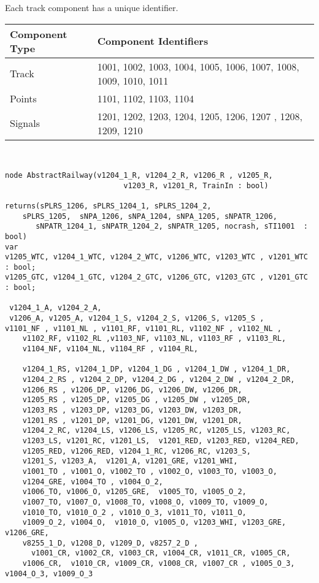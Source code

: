 Each track component has a unique identifier.

\begin{center}
    \begin{tabular}{ | l |  p{5cm} |}
    \hline
    Component Type & Component Identifiers \\ \hline
    Track &   1001, 1002, 1003, 1004, 1005, 1006, 1007, 1008, 1009, 1010, 1011 \\ \hline
    Points &  1101, 1102, 1103, 1104  \\ \hline
    Signals & 1201, 1202, 1203, 1204, 1205, 1206, 1207 , 1208, 1209, 1210 \\
    \hline
    \end{tabular}
\end{center}



\begin{verbatim}


node AbstractRailway(v1204_1_R, v1204_2_R, v1206_R , v1205_R,
                           v1203_R, v1201_R, TrainIn : bool)

returns(sPLRS_1206, sPLRS_1204_1, sPLRS_1204_2,
	sPLRS_1205,  sNPA_1206, sNPA_1204, sNPA_1205, sNPATR_1206,
       sNPATR_1204_1, sNPATR_1204_2, sNPATR_1205, nocrash, sTI1001  : bool)
var 
v1205_WTC, v1204_1_WTC, v1204_2_WTC, v1206_WTC, v1203_WTC , v1201_WTC : bool;
v1205_GTC, v1204_1_GTC, v1204_2_GTC, v1206_GTC, v1203_GTC , v1201_GTC : bool;
	
 v1204_1_A, v1204_2_A,
 v1206_A, v1205_A, v1204_1_S, v1204_2_S, v1206_S, v1205_S ,
v1101_NF , v1101_NL , v1101_RF, v1101_RL, v1102_NF , v1102_NL ,
    v1102_RF, v1102_RL ,v1103_NF, v1103_NL, v1103_RF , v1103_RL,
	v1104_NF, v1104_NL, v1104_RF , v1104_RL,
	
	v1204_1_RS, v1204_1_DP, v1204_1_DG , v1204_1_DW , v1204_1_DR, 
	v1204_2_RS , v1204_2_DP, v1204_2_DG , v1204_2_DW , v1204_2_DR, 
	v1206_RS , v1206_DP, v1206_DG, v1206_DW, v1206_DR,
	v1205_RS , v1205_DP, v1205_DG , v1205_DW , v1205_DR,
	v1203_RS , v1203_DP, v1203_DG, v1203_DW, v1203_DR,
	v1201_RS , v1201_DP, v1201_DG, v1201_DW, v1201_DR,
	v1204_2_RC, v1204_LS, v1206_LS, v1205_RC, v1205_LS, v1203_RC, 
	v1203_LS, v1201_RC, v1201_LS,  v1201_RED, v1203_RED, v1204_RED,
	v1205_RED, v1206_RED, v1204_1_RC, v1206_RC, v1203_S,
    v1201_S, v1203_A,  v1201_A, v1201_GRE, v1201_WHI,
	v1001_TO , v1001_O, v1002_TO , v1002_O, v1003_TO, v1003_O,
	v1204_GRE, v1004_TO , v1004_O_2,
	v1006_TO, v1006_O, v1205_GRE,  v1005_TO, v1005_O_2,
	v1007_TO, v1007_O, v1008_TO, v1008_O, v1009_TO, v1009_O,
	v1010_TO, v1010_O_2 , v1010_O_3, v1011_TO, v1011_O,
	v1009_O_2, v1004_O,  v1010_O, v1005_O, v1203_WHI, v1203_GRE, v1206_GRE,
	v8255_1_D, v1208_D, v1209_D, v8257_2_D ,
      v1001_CR, v1002_CR, v1003_CR, v1004_CR, v1011_CR, v1005_CR,
	v1006_CR,  v1010_CR, v1009_CR, v1008_CR, v1007_CR , v1005_O_3, v1004_O_3, v1009_O_3



\end{verbatim}
